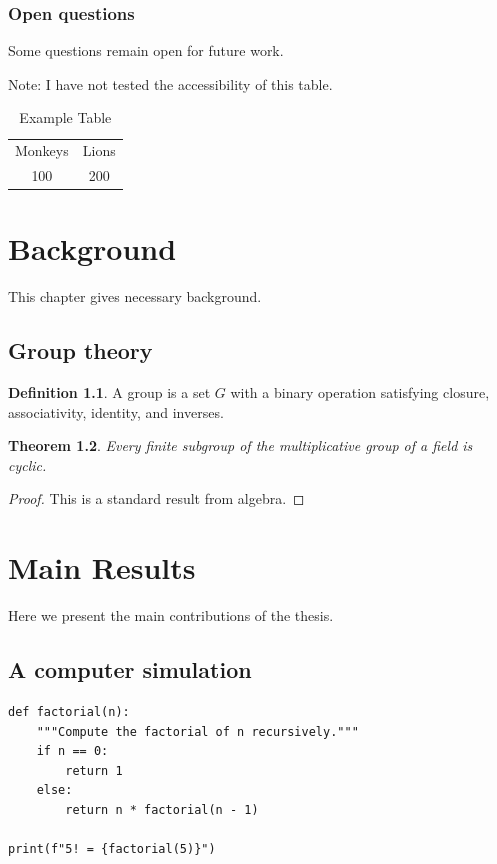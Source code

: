 \documentclass[12pt,reqno,oneside]{amsbook}
\newtheorem{theorem}{Theorem}[chapter]
\theoremstyle{definition}
\newtheorem{definition}[theorem]{Definition}
\begin{document}
\subsection{Open questions}
Some questions remain open for future work.

Note: I have not tested the accessibility of this table.
\begin{table}[h]
\centering
\begin{tabular}{cc}
Monkeys & Lions \\
100 & 200
\end{tabular}
\caption{Example Table}
\end{table}


\chapter{Background}
This chapter gives necessary background.

\section{Group theory}
\begin{definition}
A group is a set $G$ with a binary operation satisfying closure, associativity, identity, and inverses.
\end{definition}

\begin{theorem}
Every finite subgroup of the multiplicative group of a field is cyclic.
\end{theorem}

\begin{proof}
This is a standard result from algebra.
\end{proof}

\chapter{Main Results}
Here we present the main contributions of the thesis.

\section{A computer simulation}



\begin{lstlisting}[basicstyle = \singlespacing\ttfamily\small,resetmargins=true,tabsize=5,extendedchars=false]
def factorial(n):
    """Compute the factorial of n recursively."""
    if n == 0:
        return 1
    else:
        return n * factorial(n - 1)

print(f"5! = {factorial(5)}")
\end{lstlisting}
\end{document}
